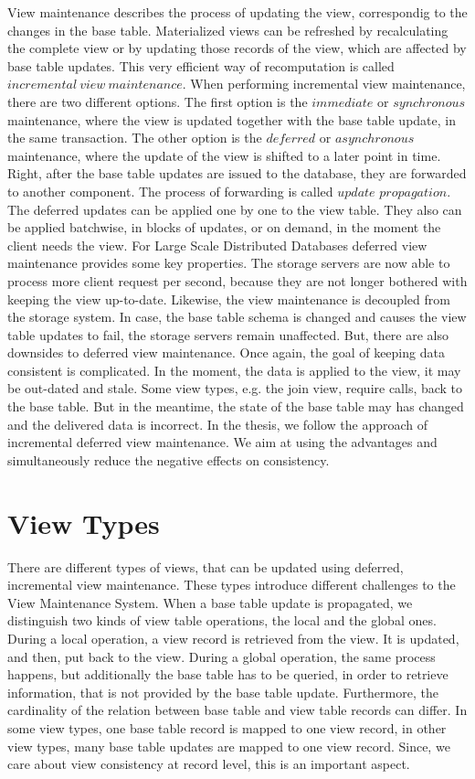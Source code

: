 \documentclass[11pt,a4paper,bibtotoc,idxtotoc,headsepline,footsepline,footexclude,BCOR12mm,DIV13]{scrbook}
\begin{document}
View maintenance describes the process of updating the view, correspondig to the changes in the base table. Materialized views can be refreshed by recalculating the complete view or by updating those records of the view, which are affected by base table updates. This very efficient way of recomputation is called $incremental\:view\:maintenance$. When performing incremental view maintenance, there are two different options. The first option is the $immediate$ or $synchronous$ maintenance, where the view is updated together with the base table update, in the same transaction. The other option is the $deferred$ or $asynchronous$ maintenance, where the update of the view is shifted to a later point in time. Right, after the base table updates are issued to the database, they are forwarded to another component. The process of forwarding is called $update$ $propagation$. The deferred updates can be applied one by one to the view table. They also can be applied batchwise, in blocks of updates, or on demand, in the moment the client needs the view.  For Large Scale Distributed Databases deferred view maintenance provides some key properties. The storage servers are now able to process more client request per second, because they are not longer bothered with keeping the view up-to-date. Likewise, the view maintenance is decoupled from the storage system. In case, the base table schema is changed and causes the view table updates to fail, the storage servers remain unaffected. But, there are also downsides to deferred view maintenance. Once again, the goal of keeping data consistent is complicated. In the moment, the data is applied to the view, it may be out-dated and stale. Some view types, e.g. the join view, require calls, back to the base table. But in the meantime, the state of the base table may has changed and the delivered data is incorrect. In the thesis, we follow the approach of incremental deferred view maintenance. We aim at using the advantages and simultaneously reduce the negative effects on consistency.


\section{View Types}
\label{sec:viewtypes}


There are different types of views, that can be updated using deferred, incremental view maintenance. These types introduce different challenges to the View Maintenance System. When a base table update is propagated, we distinguish two kinds of view table operations, the local and the global ones. During a local operation, a view record is retrieved from the view. It is updated, and then, put back to the view. During a global operation, the same process happens, but additionally the base table has to be queried, in order to retrieve information, that is not provided by the base table update. Furthermore, the cardinality of the relation between base table and view table records can differ. In some view types, one base table record is mapped to one view record, in other view types, many base table updates are mapped to one view record. Since, we care about view consistency at record level, this is an important aspect.
\end{document}

